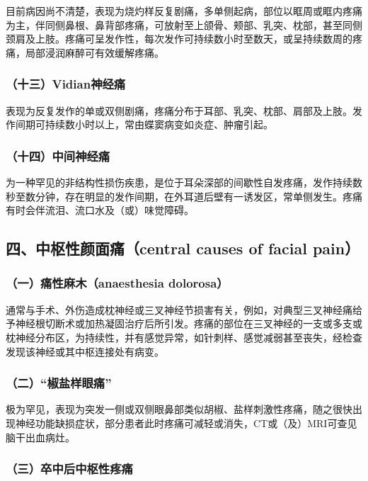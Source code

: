 目前病因尚不清楚，表现为烧灼样反复剧痛，多单侧起病，部位以眶周或眶内疼痛为主，伴同侧鼻根、鼻背部疼痛，可放射至上颌骨、颊部、乳突、枕部，甚至同侧颈肩及上肢。疼痛可呈发作性，每次发作可持续数小时至数天，或呈持续数周的疼痛，局部浸润麻醉可有效缓解疼痛。

\subsubsection{（十三）Vidian神经痛}

表现为反复发作的单或双侧剧痛，疼痛分布于耳部、乳突、枕部、肩部及上肢。发作间期可持续数小时以上，常由蝶窦病变如炎症、肿瘤引起。

\subsubsection{（十四）中间神经痛}

为一种罕见的非结构性损伤疾患，是位于耳朵深部的间歇性自发疼痛，发作持续数秒至数分钟，存在明显的发作间期，在外耳道后壁有一诱发区，常单侧发生。疼痛有时会伴流泪、流口水及（或）味觉障碍。

\protect\hypertarget{text00356.html}{}{}

\subsection{四、中枢性颜面痛（central causes of facial pain）}

\subsubsection{（一）痛性麻木（anaesthesia dolorosa）}

通常与手术、外伤造成枕神经或三叉神经节损害有关，例如，对典型三叉神经痛给予神经根切断术或加热凝固治疗后所引发。疼痛的部位在三叉神经的一支或多支或枕神经分布区，为持续性，并有感觉异常，如针刺样、感觉减弱甚至丧失，经检查发现该神经或其中枢连接处有病变。

\subsubsection{（二）“椒盐样眼痛”}

极为罕见，表现为突发一侧或双侧眼鼻部类似胡椒、盐样刺激性疼痛，随之很快出现神经功能缺损症状，部分患者此时疼痛可减轻或消失，CT或（及）MRI可查见脑干出血病灶。

\subsubsection{（三）卒中后中枢性疼痛}

